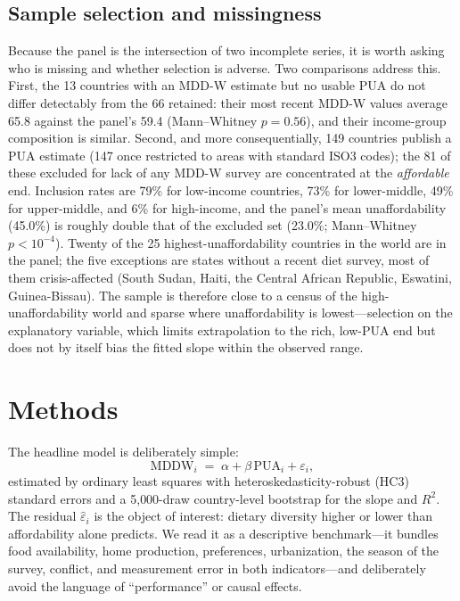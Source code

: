 \documentclass[11pt]{article}
\begin{document}
\subsection{Sample selection and missingness}\label{sec:missing}
Because the panel is the intersection of two incomplete series, it is worth asking who is missing and whether selection is adverse. Two comparisons address this. First, the 13 countries with an MDD-W estimate but no usable PUA do not differ detectably from the 66 retained: their most recent MDD-W values average 65.8 against the panel's 59.4 (Mann--Whitney $p=0.56$), and their income-group composition is similar. Second, and more consequentially, 149 countries publish a PUA estimate (147 once restricted to areas with standard ISO3 codes); the 81 of these excluded for lack of any MDD-W survey are concentrated at the \emph{affordable} end. Inclusion rates are 79\% for low-income countries, 73\% for lower-middle, 49\% for upper-middle, and 6\% for high-income, and the panel's mean unaffordability (45.0\%) is roughly double that of the excluded set (23.0\%; Mann--Whitney $p<10^{-4}$). Twenty of the 25 highest-unaffordability countries in the world are in the panel; the five exceptions are states without a recent diet survey, most of them crisis-affected (South Sudan, Haiti, the Central African Republic, Eswatini, Guinea-Bissau). The sample is therefore close to a census of the high-unaffordability world and sparse where unaffordability is lowest---selection on the explanatory variable, which limits extrapolation to the rich, low-PUA end but does not by itself bias the fitted slope within the observed range.

\section{Methods}\label{sec:methods}

The headline model is deliberately simple:
\begin{equation}
\mathrm{MDDW}_i \;=\; \alpha + \beta\,\mathrm{PUA}_i + \varepsilon_i,
\label{eq:main}
\end{equation}
estimated by ordinary least squares with heteroskedasticity-robust (HC3) standard errors and a 5{,}000-draw country-level bootstrap for the slope and $R^2$. The residual $\hat\varepsilon_i$ is the object of interest: dietary diversity higher or lower than affordability alone predicts. We read it as a descriptive benchmark---it bundles food availability, home production, preferences, urbanization, the season of the survey, conflict, and measurement error in both indicators---and deliberately avoid the language of ``performance'' or causal effects.
\end{document}
